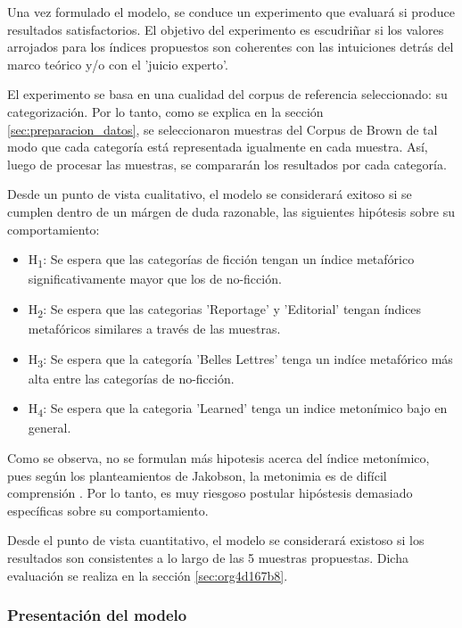 \documentclass[12pt,letterpaper,twoside]{article}
\begin{document}
Una vez formulado el modelo, se conduce un experimento que evaluará si produce resultados
satisfactorios. El objetivo del experimento es escudriñar si los valores arrojados para
los índices propuestos son coherentes con las intuiciones detrás del marco teórico y/o
con el 'juicio experto'.

El experimento se basa en una cualidad del corpus de referencia seleccionado: su categorización.
Por lo tanto, como se explica en la sección \ref{sec:preparacion_datos}, se seleccionaron
muestras del Corpus de Brown  de tal modo que cada categoría está representada igualmente
en cada muestra. Así, luego de procesar las muestras, se compararán los resultados por
cada categoría.

Desde un punto de vista cualitativo, el modelo se considerará exitoso si se cumplen dentro
de un márgen de duda razonable, las siguientes hipótesis sobre su comportamiento:

\begin{itemize}
\item H\textsubscript{1}: Se espera que las categorías de ficción tengan un índice metafórico significativamente mayor que los de no-ficción.
\item H\textsubscript{2}: Se espera que las categorias 'Reportage' y 'Editorial' tengan índices metafóricos similares a través de las muestras.
\item H\textsubscript{3}: Se espera que la categoría 'Belles Lettres' tenga un indíce metafórico más alta entre las categorías de no-ficción.
\item H\textsubscript{4}: Se espera que la categoria 'Learned' tenga un indice metonímico bajo en general.
\end{itemize}


Como se observa, no se formulan más hipotesis acerca del índice
metonímico, pues según los planteamientos de Jakobson, la metonimia
es de difícil comprensión \cite{jakobson1956two}. Por lo tanto, es
muy riesgoso postular hipóstesis demasiado específicas sobre su
comportamiento.

Desde el punto de vista cuantitativo, el modelo se considerará existoso
si los resultados son consistentes a lo largo de las 5 muestras propuestas. Dicha evaluación
se realiza en la sección \ref{sec:org4d167b8}.


\subsubsection{Presentación del modelo}
\label{sec:org65a60e5}
\end{document}
